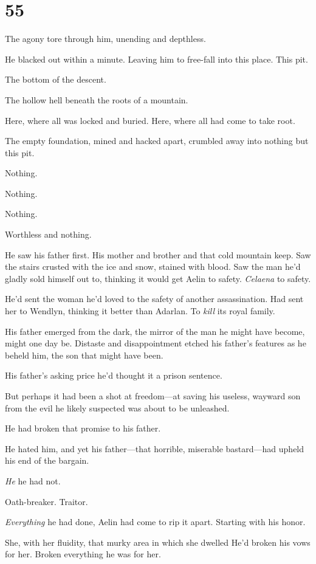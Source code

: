 
\chapter{55}

The agony tore through him, unending and depthless.

He blacked out within a minute. Leaving him to free-fall into this place. This pit.

The bottom of the descent.

The hollow hell beneath the roots of a mountain.

Here, where all was locked and buried. Here, where all had come to take root.

The empty foundation, mined and hacked apart, crumbled away into nothing but this pit.

Nothing.

Nothing.

Nothing.

Worthless and nothing.

He saw his father first. His mother and brother and that cold mountain keep. Saw the stairs crusted with the ice and snow, stained with blood. Saw the man he'd gladly sold himself out to, thinking it would get Aelin to safety. \emph{Celaena} to safety.

He'd sent the woman he'd loved to the safety of another assassination. Had sent her to Wendlyn, thinking it better than Adarlan. To \emph{kill}
its royal family.

His father emerged from the dark, the mirror of the man he might have become, might one day be. Distaste and disappointment etched his father's features as he beheld him, the son that might have been.

His father's asking price  he'd thought it a prison sentence.

But perhaps it had been a shot at freedom---at saving his useless, wayward son from the evil he likely suspected was about to be unleashed.

He had broken that promise to his father.

He hated him, and yet his father---that horrible, miserable bastard---had upheld his end of the bargain.

\emph{He}  he had not.

Oath-breaker. Traitor.

\emph{Everything} he had done, Aelin had come to rip it apart. Starting with his honor.

She, with her fluidity, that murky area in which she dwelled 
He'd broken his vows for her. Broken everything he was for her.

